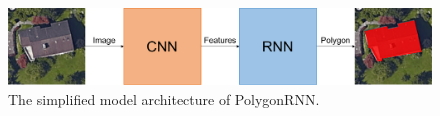 \begin{figure}[!h]
	\centering
	\includegraphics[width=\fig\textwidth]{3-00.pdf}
    \caption[The simplified model architecture of PolygonRNN]{The simplified model architecture of PolygonRNN.}
    \label{fig:simppoly}
\end{figure}